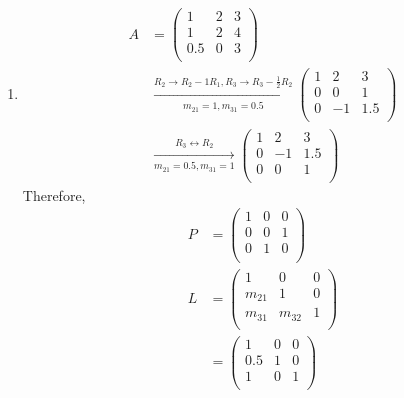 \documentclass[fleqn, a4paper, 12pt, twoside]{article}
\theoremstyle{definition}
\theoremstyle{theorem}
\begin{document}
\begin{solution}
	\begin{enumerate}[leftmargin=*]
		\item
			\begin{align*}
				A &=
					\begin{pmatrix}
						1   & 2 & 3 \\
						1   & 2 & 4 \\
						0.5 & 0 & 3 \\
					\end{pmatrix}\\
				&\xrightarrow[m_{2 1} = 1 , m_{3 1} = 0.5]{R_2 \to R_2 - 1 R_1 , R_3 \to R_3 - \frac{1}{2} R_2}
					\begin{pmatrix}
						1 & 2  & 3   \\
						0 & 0  & 1   \\
						0 & -1 & 1.5 \\
					\end{pmatrix}\\
				&\xrightarrow[m_{2 1} = 0.5 , m_{3 1} = 1]{R_3 \leftrightarrow R_2}
					\begin{pmatrix}
						1 & 2  & 3   \\
						0 & -1 & 1.5 \\
						0 & 0  & 1   \\
					\end{pmatrix}
			\end{align*}
			Therefore,
			\begin{align*}
				P &=
					\begin{pmatrix}
						1 & 0 & 0 \\
						0 & 0 & 1 \\
						0 & 1 & 0 \\
					\end{pmatrix}\\
				L &=
					\begin{pmatrix}
						1       & 0       & 0 \\
						m_{2 1} & 1       & 0 \\
						m_{3 1} & m_{3 2} & 1 \\
					\end{pmatrix}\\
				&=
					\begin{pmatrix}
						1   & 0 & 0 \\
						0.5 & 1 & 0 \\
						1   & 0 & 1 \\
					\end{pmatrix}\\

\end{align*}
\end{enumerate}
\end{solution}
\end{document}
